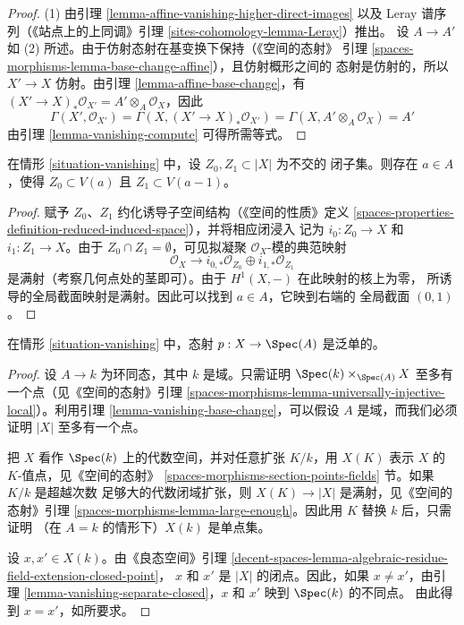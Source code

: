\begin{proof}
(1) 由引理 \ref{lemma-affine-vanishing-higher-direct-images} 以及 Leray
谱序列（《站点上的上同调》引理 \ref{sites-cohomology-lemma-Leray}）推出。
设 $A \to A'$ 如 (2) 所述。由于仿射态射在基变换下保持（《空间的态射》
引理 \ref{spaces-morphisms-lemma-base-change-affine}），且仿射概形之间的
态射是仿射的，所以 $X' \to X$ 仿射。由引理
\ref{lemma-affine-base-change}，有
$(X' \to X)_*\mathcal{O}_{X'} = A' \otimes_A \mathcal{O}_X$，因此
$$
\Gamma(X', \mathcal{O}_{X'}) =
\Gamma(X, (X' \to X)_*\mathcal{O}_{X'}) =
\Gamma(X, A' \otimes_A \mathcal{O}_X) = A'
$$
由引理 \ref{lemma-vanishing-compute} 可得所需等式。
\end{proof}

\begin{lemma}
\label{lemma-vanishing-separate-closed}
在情形 \ref{situation-vanishing} 中，设 $Z_0, Z_1 \subset |X|$ 为不交的
闭子集。则存在 $a \in A$，使得 $Z_0 \subset V(a)$ 且
$Z_1 \subset V(a - 1)$。
\end{lemma}

\begin{proof}
赋予 $Z_0$、$Z_1$ 约化诱导子空间结构（《空间的性质》定义
\ref{spaces-properties-definition-reduced-induced-space}），并将相应闭浸入
记为 $i_0 : Z_0 \to X$ 和 $i_1 : Z_1 \to X$。由于
$Z_0 \cap Z_1 = \emptyset$，可见拟凝聚 $\mathcal{O}_X$-模的典范映射
$$
\mathcal{O}_X
\longrightarrow
i_{0, *}\mathcal{O}_{Z_0} \oplus i_{1, *}\mathcal{O}_{Z_1}
$$
是满射（考察几何点处的茎即可）。由于 $H^1(X, -)$ 在此映射的核上为零，
所诱导的全局截面映射是满射。因此可以找到 $a \in A$，它映到右端的
全局截面 $(0, 1)$。
\end{proof}

\begin{lemma}
\label{lemma-vanishing-injective}
在情形 \ref{situation-vanishing} 中，态射 $p : X \to \Spec(A)$ 是泛单的。
\end{lemma}

\begin{proof}
设 $A \to k$ 为环同态，其中 $k$ 是域。只需证明
$\Spec(k) \times_{\Spec(A)} X$ 至多有一个点（见《空间的态射》引理
\ref{spaces-morphisms-lemma-universally-injective-local}）。利用引理
\ref{lemma-vanishing-base-change}，可以假设 $A$ 是域，而我们必须证明
$|X|$ 至多有一个点。

\medskip\noindent
把 $X$ 看作 $\Spec(k)$ 上的代数空间，并对任意扩张 $K/k$，用 $X(K)$
表示 $X$ 的 $K$-值点，见《空间的态射》
\ref{spaces-morphisms-section-points-fields} 节。如果 $K/k$ 是超越次数
足够大的代数闭域扩张，则 $X(K) \to |X|$ 是满射，见《空间的态射》引理
\ref{spaces-morphisms-lemma-large-enough}。因此用 $K$ 替换 $k$ 后，只需证明
（在 $A = k$ 的情形下）$X(k)$ 是单点集。

\medskip\noindent
设 $x, x' \in X(k)$。由《良态空间》引理
\ref{decent-spaces-lemma-algebraic-residue-field-extension-closed-point}，
$x$ 和 $x'$ 是 $|X|$ 的闭点。因此，如果 $x \not = x'$，由引理
\ref{lemma-vanishing-separate-closed}，$x$ 和 $x'$ 映到 $\Spec(k)$ 的不同点。
由此得到 $x = x'$，如所要求。
\end{proof}

